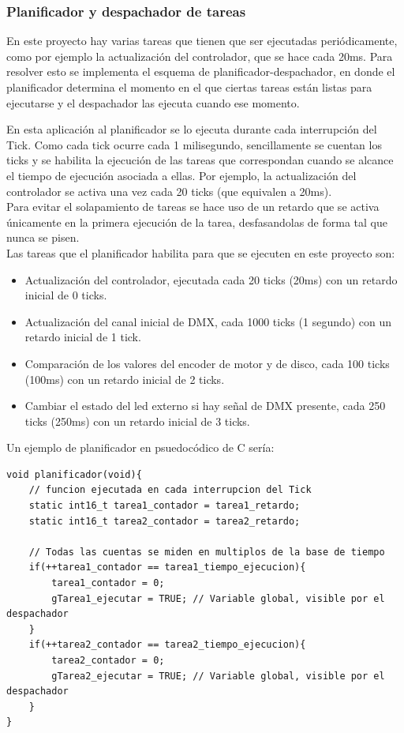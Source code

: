 \subsubsection{Planificador y despachador de tareas}
En este proyecto hay varias tareas que tienen que ser ejecutadas periódicamente, como por ejemplo la actualización del controlador, que se hace cada 20ms. Para resolver esto se implementa el esquema de planificador-despachador, en donde el planificador determina el momento en el que ciertas tareas están listas para ejecutarse y el despachador las ejecuta cuando ese momento.

En esta aplicación al planificador se lo ejecuta durante cada interrupción del Tick. Como cada tick ocurre cada 1 milisegundo, sencillamente se cuentan los ticks y se habilita la ejecución de las tareas que correspondan cuando se alcance el tiempo de ejecución asociada a ellas. Por ejemplo, la actualización del controlador se activa una vez cada 20 ticks (que equivalen a 20ms).\\
Para evitar el solapamiento de tareas se hace uso de un retardo que se activa únicamente en la primera ejecución de la tarea, desfasandolas de forma tal que nunca se pisen. \\
Las tareas que el planificador habilita para que se ejecuten en este proyecto son:
\begin{itemize}
	\item Actualización del controlador, ejecutada cada 20 ticks (20ms) con un retardo inicial de 0 ticks.
	\item Actualización del canal inicial de DMX, cada 1000 ticks (1 segundo) con un retardo inicial de 1 tick.
	\item Comparación de los valores del encoder de motor y de disco, cada 100 ticks (100ms) con un retardo inicial de 2 ticks.
	\item Cambiar el estado del led externo si hay señal de DMX presente, cada 250 ticks (250ms) con un retardo inicial de 3 ticks.
\end{itemize}
Un ejemplo de planificador en psuedocódico de C sería:
\begin{lstlisting}[style=CStyle]
void planificador(void){
	// funcion ejecutada en cada interrupcion del Tick
	static int16_t tarea1_contador = tarea1_retardo;
	static int16_t tarea2_contador = tarea2_retardo;
	
	// Todas las cuentas se miden en multiplos de la base de tiempo
	if(++tarea1_contador == tarea1_tiempo_ejecucion){
		tarea1_contador = 0;
		gTarea1_ejecutar = TRUE; // Variable global, visible por el despachador
	}
	if(++tarea2_contador == tarea2_tiempo_ejecucion){
		tarea2_contador = 0;
		gTarea2_ejecutar = TRUE; // Variable global, visible por el despachador
	}
}
\end{lstlisting}


